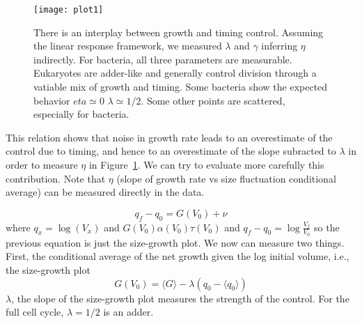\documentclass[a4paper,12pt,rmp,superscriptaddress]{revtex4}
\begin{document}
\begin{figure}[htbp]
  \centering
   \texttt{[image: plot1]}
%
%
%
   \caption{There is an interplay between growth and timing
     control. Assuming the linear response framework, we measured
     $\lambda$ and $\gamma$ inferring
     $\eta$ indirectly. For bacteria, all three parameters are
     measurable.  Eukaryotes are adder-like and generally control
     division through a vatiable mix of growth and timing. Some
     bacteria show the expected behavior $eta \simeq 0$ $\lambda
     \simeq 1/2$. Some other points are scattered, especially for
     bacteria.  }
   \label{fig:1}
\end{figure}

This relation shows that noise in growth rate leads to an overestimate
of the control due to timing, and hence to an overestimate of the
slope subracted to $\lambda$ in order to measure $\eta$ in
Figure~\ref{fig:1}. We can try to evaluate more carefully this
contribution. Note that $\eta$ (slope of growth rate vs size
fluctuation conditional average) can be measured directly in the data.


\begin{displaymath}
  q_f - q_0 = G(V_0) + \nu
\end{displaymath}
where $q_x = \log(V_x)$ and $G(V_0) \alpha(V_0) \tau(V_0)$ and 
%
$q_f - q_0 = \log\frac{V_f}{V_0}$ so the previous equation is just the
size-growth plot.  We now can measure two things. First, the
conditional average of the net growth given the log initial volume,
i.e., the size-growth plot
%
\begin{displaymath}
  G(V_0) = \langle G \rangle - \lambda (q_0 - \langle q_0 \rangle) 
\end{displaymath}
%
$\lambda$, the slope of the size-growth plot measures the strength of
the control. For the full cell cycle, $\lambda = 1/2$ is an adder.
\end{document}
